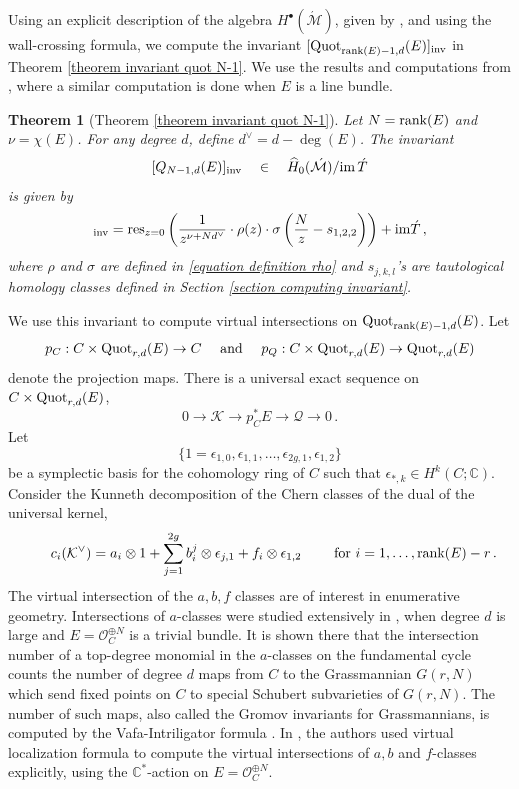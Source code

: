 \documentclass[11pt]{amsart}
\newtheorem*{theorem*}{Theorem}
\theoremstyle{remark}
\newcommand{\e}{\epsilon}
\newcommand{\C}{\mathbb{C}}
\newcommand{\Q}{\mathcal{Q}}
\renewcommand{\O}{\mathcal{O}}
\newcommand{\mb}[1]{\mathbb{#1}}
\newcommand{\Mdash}{\acute{\mathcal{M}}}
\newcommand{\K}{\mathcal{K}}
\newcommand{\im}{\textnormal{im}\,}
\newcommand{\rk}{\textnormal{rank}}
\newcommand{\wh}[1]{\widehat{#1}}
\newcommand{\quot}[0]{\textnormal{Quot}}
\newcommand{\inv}[0]{\textnormal{inv}}
\newcommand{\res}{\textnormal{res}}
\newcommand{\du}{d^\vee}
\numberwithin{theorem}{section}
\begin{document}
Using an explicit description of the algebra $H^{\bullet}(\Mdash)$,
given by \cite{gros20}, and
using the wall-crossing formula, we compute the invariant
$[\quot_{\rk(E)-1,d}(E)]_\inv$ in Theorem \ref{theorem invariant quot N-1}.
We use the results and computations from \cite{Bu23}, 
where a similar computation is done when $E$ is a line bundle.
\begin{theorem*}[Theorem \ref{theorem invariant quot N-1}]
    Let $N =\rk(E)$ and $\nu = \chi(E)$.
    For any degree $d$, define $\du = d- \deg(E)$.
    The invariant 
    $$[Q_{N-1,d}(E)]_\inv \quad  \in \quad \wh H_0(\Mdash)/\im \acute T$$ is given by
    \begin{equation*}%
    [Q_{N-1,d}(E)]_\inv = 
    \res_{z=0} \left( \frac{1}{z^{\nu+N\du}} \cdot \rho(z) \cdot \sigma\left(\frac{N}{z} -s_{1,2,2}\right)\right) + \textnormal{im} \acute{T}\,,
    \end{equation*}
    where $\rho$ and $\sigma$ are defined in \eqref{equation definition rho}
    and $s_{j,k,l}$'s are tautological homology classes defined in Section \ref{section computing invariant}.
\end{theorem*}
We use this invariant to compute virtual intersections on $\quot_{\rk(E)-1,d}(E)$.
Let 
$$p_C : C \times \quot_{r,d}(E) \to C \quad \text{ and }
\quad p_Q : C \times \quot_{r,d}(E) \to \quot_{r,d}(E)$$
denote the projection maps.
There is a universal exact sequence on $C \times \quot_{r,d}(E)$,
$$0 \to \K \to p_C^*E \to \Q \to 0\,.$$
Let 
$$\{1=\e_{1,0}, \e_{1,1}, \dots,\e_{2g,1},\e_{1,2}\}$$
be a symplectic basis for the cohomology ring of $C$ such that $\e_{*,k} \in H^k(C;\mb C)$.
Consider the Kunneth decomposition of the Chern classes of the dual of the universal kernel,
$$\qquad  c_i(\K^\vee) = a_i \otimes 1 + \sum_{j=1}^{2g} b_i^j \otimes \e_{j,1} + f_i \otimes \e_{1,2} \qquad \text{ for }i=1,\dots,\rk(E)-r \,.$$
The virtual intersection of the $a,b,f$ classes are of interest in enumerative geometry.
Intersections of $a$-classes were studied extensively in \cite{Ber94}, when degree $d$ is large 
and $E = \O_C^{\oplus N}$ is a trivial bundle.
It is shown there that the intersection number of a top-degree monomial in the $a$-classes on the fundamental cycle counts the number of degree $d$ maps from
$C$ to the Grassmannian $G(r,N)$ which send 
fixed points on $C$ to special Schubert
subvarieties of $G(r,N)$. 
The number of such maps, also called the Gromov invariants for Grassmannians, is computed by the Vafa-Intriligator formula \cite{Int91}.
In \cite{MO07c}, 
the authors used virtual localization formula to compute the virtual intersections of $a,b$ and $f$-classes explicitly, using the $\C^*$-action on $E = \O_C^{\oplus N}$.
\end{document}
